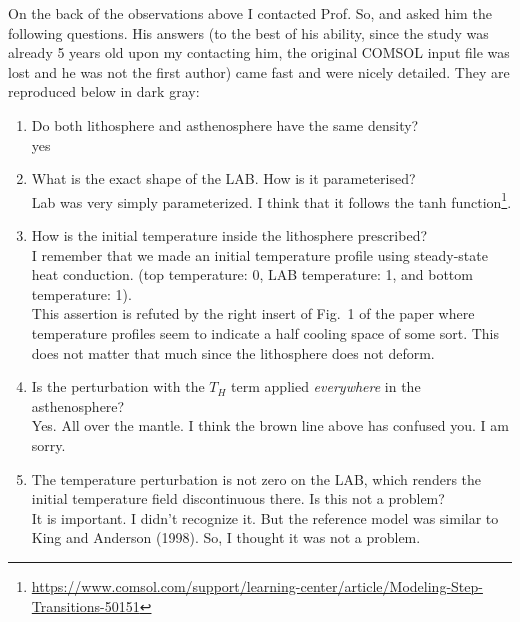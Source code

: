On the back of the observations above I contacted Prof. So, and 
asked him the following questions. His answers (to the best of his ability, since
the study was already 5 years old upon my contacting him, the original COMSOL
input file was lost and he was not 
the first author) came fast and were nicely detailed. They are reproduced below in {\color{darkgray} dark gray}:
\begin{enumerate}

\item Do both lithosphere and asthenosphere have the same density?\\
 {\color{darkgray} yes}

\item What is the exact shape of the LAB. How is it parameterised?  \\
{\color{darkgray} 
Lab was very simply parameterized. I think that it follows the tanh function\footnote{
\url{https://www.comsol.com/support/learning-center/article/Modeling-Step-Transitions-50151}}.}

\item How is the initial temperature inside the lithosphere prescribed? \\
{\color{darkgray} I remember that we made an initial temperature profile using steady-state heat conduction. 
(top temperature: 0, LAB temperature: 1, and bottom temperature: 1).}\\
This assertion is refuted by the right insert of Fig.~1 of the paper where 
temperature profiles seem to indicate a half cooling space of some sort.
This does not matter that much since the lithosphere does not deform.

\item Is the perturbation with the $T_H$ term applied {\it everywhere} in 
the asthenosphere? \\
{\color{darkgray} Yes. All over the mantle. I think the brown line above 
has confused you. I am sorry.}
 
\item The temperature perturbation is not zero on the LAB, which renders the 
initial temperature field discontinuous there. Is this not a problem? \\
{\color{darkgray}
It is important. I didn't recognize it. But the reference model was similar 
to King and Anderson (1998). So, I thought it was not a problem.}



\end{enumerate}
